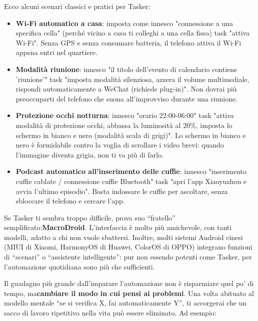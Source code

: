 Ecco alcuni scenari classici e pratici per Tasker:

\begin{itemize}
  \item \textbf{Wi-Fi automatico a casa}: imposta come innesco "connessione a una specifica cella" (perché vicino a casa ti colleghi a una cella fissa) task "attiva Wi-Fi". Senza GPS e senza consumare batteria, il telefono attiva il Wi-Fi appena entri nel quartiere.
  \item \textbf{Modalità riunione}: innesco "il titolo dell'evento di calendario contiene 'riunione'" task "imposta modalità silenziosa, azzera il volume multimediale, rispondi automaticamente a WeChat (richiede plug-in)". Non dovrai più preoccuparti del telefono che suona all'improvviso durante una riunione.
  \item \textbf{Protezione occhi notturna}: innesco "orario 22:00-06:00" task "attiva modalità di protezione occhi, abbassa la luminosità al 20\%, imposta lo schermo in bianco e nero (modalità scala di grigi)". Lo schermo in bianco e nero è formidabile contro la voglia di scrollare i video brevi: quando l'immagine diventa grigia, non ti va più di farlo.
  \item \textbf{Podcast automatico all'inserimento delle cuffie}: innesco "inserimento cuffie cablate / connessione cuffie Bluetooth" task "apri l'app Xiaoyuzhou e avvia l'ultimo episodio". Basta indossare le cuffie per ascoltare, senza sbloccare il telefono e cercare l'app.
\end{itemize}

Se Tasker ti sembra troppo difficile, prova suo “fratello” semplificato:\textbf{MacroDroid}. L'interfaccia è molto più amichevole, con tanti modelli, adatto a chi non vuole sbattersi. Inoltre, molti sistemi Android cinesi (MIUI di Xiaomi, HarmonyOS di Huawei, ColorOS di OPPO) integrano funzioni di “scenari” o “assistente intelligente”: pur non essendo potenti come Tasker, per l'automazione quotidiana sono più che sufficienti.


Il guadagno più grande dall'imparare l'automazione non è risparmiare quel po' di tempo, ma\textbf{cambiare il modo in cui pensi ai problemi}. Una volta abituato al modello mentale “se si verifica X, fai automaticamente Y”, ti accorgerai che un sacco di lavoro ripetitivo nella vita può essere eliminato. Ad esempio:

